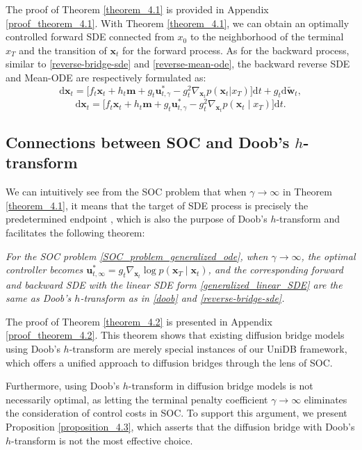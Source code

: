 The proof of Theorem \ref{theorem_4.1} is provided in Appendix \ref{proof_theorem_4.1}. With Theorem \ref{theorem_4.1}, we can obtain an optimally controlled forward SDE connected from $x_0$ to the neighborhood of the terminal $x_T$ and the transition of $\mathbf{x}_t$ for the forward process. As for the backward process, similar to \eqref{reverse-bridge-sde} and \eqref{reverse-mean-ode}, the backward reverse SDE and Mean-ODE are respectively formulated as: 
\begin{equation}\label{ours_reverse_sde}
\mathrm{d} \mathbf{x}_t = \Big[f_t \mathbf{x}_t + h_t \mathbf{m} + g_t  \mathbf{u}_{t, \gamma}^{*} - g^2_t \nabla_{\mathbf{x}_t} p(\mathbf{x}_t | x_T) \Big] \mathrm{d} t+ g_t \mathrm{d} \tilde{\mathbf{w}}_t,
\end{equation}
\begin{equation}\label{ours_reverse_ode}
\mathrm{d} \mathbf{x}_t = \Big[f_t \mathbf{x}_t + h_t \mathbf{m} + g_t  \mathbf{u}_{t, \gamma}^{*} - g^2_t \nabla_{\mathbf{x}_t} p(\mathbf{x}_t \mid x_T) \Big] \mathrm{d}t.
\end{equation}


\subsection{Connections between SOC and Doob's $h$-transform}
We can intuitively see from the SOC problem that when $\gamma \to \infty$ in Theorem \ref{theorem_4.1}, it means that the target of SDE process is precisely the predetermined endpoint \cite{chen2024generativemodelingphasestochastic}, which is also the purpose of Doob's $h$-transform and facilitates the following theorem:
\begin{theorem}\label{theorem_4.2} 
\textit{For the SOC problem \eqref{SOC_problem_generalized_ode}, when $\gamma \to \infty$, the optimal controller becomes $\mathbf{u}^{*}_{t, \infty} = g_t \nabla_{\mathbf{x}_t} \log p(\mathbf{x}_T \mid \mathbf{x}_t)$, and the corresponding forward and backward SDE with the linear SDE form \eqref{generalized_linear_SDE} are the same as Doob's $h$-transform as in \eqref{doob} and \eqref{reverse-bridge-sde}. 
}
\end{theorem}
The proof of Theorem \ref{theorem_4.2} is presented in Appendix \ref{proof_theorem_4.2}. This theorem shows that existing diffusion bridge models using Doob's $h$-transform are merely special instances of our UniDB framework, which offers a unified approach to diffusion bridges through the lens of SOC.

Furthermore, using Doob's $h$-transform in diffusion bridge models is not necessarily optimal, as letting the terminal penalty coefficient $\gamma \to \infty$ eliminates the consideration of control costs in SOC. To support this argument, we present Proposition \ref{proposition_4.3}, which asserts that the diffusion bridge with Doob's $h$-transform is not the most effective choice. 

